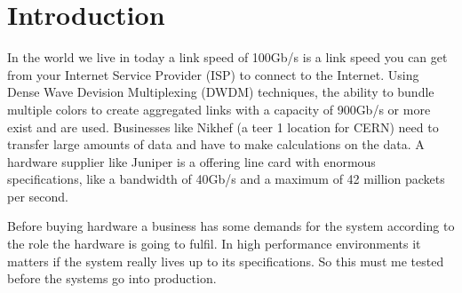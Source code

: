 \section{Introduction}
In the world we live in today a link speed of 100Gb/s  is a link speed you can get from your Internet Service Provider (ISP) to connect to the Internet. 
Using Dense Wave Devision Multiplexing (DWDM) techniques, the ability to bundle multiple colors to create aggregated links with a capacity of 900Gb/s or more exist and are used. 
Businesses like Nikhef (a teer 1 location for CERN) need to transfer large amounts of data and have to make calculations on the data.
A hardware supplier like Juniper is a offering line card with enormous specifications, like a bandwidth of 40Gb/s and a maximum of 42 million packets per second.

Before buying hardware a business has some demands for the system according to the role the hardware is going to fulfil. In high performance environments it matters if the system really lives up to its specifications. So this must me tested before the systems go into production.  
